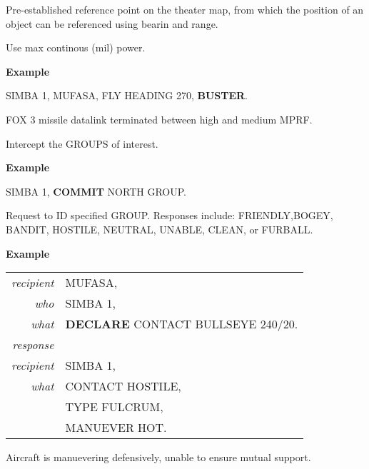 \begin{tcoloritemize}
    \blueitem[BULLSEYE] 
    Pre-established reference point on the theater map, from which the position 
    of an object can be referenced using bearin and range.

    \blueitem[BUSTER] 
    Use max continous (mil) power.

    \medskip
    \textbf{Example}
    \begin{center}
        \begin{minipage}{0.9\textwidth}
            SIMBA 1, MUFASA, FLY HEADING 270, \textbf{BUSTER}.
        \end{minipage}
    \end{center}

    \blueitem[CHEAPSHOT] 
    FOX 3 missile datalink terminated between high and medium MPRF.

    \blueitem[COMMIT] 
    Intercept the GROUPS of interest.

    \medskip
    \textbf{Example}
    \begin{center}
        \begin{minipage}{0.9\textwidth}
            SIMBA 1, \textbf{COMMIT} NORTH GROUP.
        \end{minipage}
    \end{center}

    \blueitem[DECLARE] 
    Request to ID specified GROUP. Responses include: 
    FRIENDLY,BOGEY, BANDIT, HOSTILE, NEUTRAL,
    UNABLE, CLEAN, or FURBALL. 

    \medskip
    \textbf{Example}
    \begin{center}
        \begin{tabular}{>{\itshape}r l}
            recipient & MUFASA, \\
            who & SIMBA 1, \\
            what & \textbf{DECLARE} CONTACT BULLSEYE 240/20. \\
            response \\
            recipient & SIMBA 1, \\
            what & CONTACT HOSTILE, \\
            & TYPE FULCRUM, \\
            & MANUEVER HOT. \\
        \end{tabular}
    \end{center}

    \blueitem[DEFENSIVE] 
    Aircraft is manuevering defensively, unable to ensure mutual support. 


\end{tcoloritemize}
